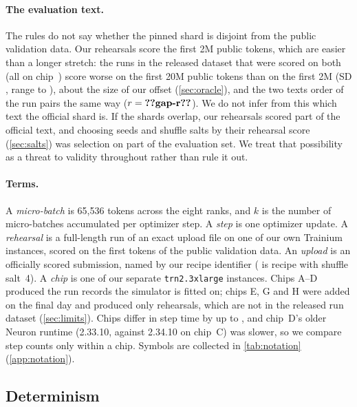 \paragraph{The evaluation text.} The rules do not say whether the pinned shard is disjoint from the public
validation data. Our rehearsals score the first 2M public tokens, which are easier than a longer stretch: the
 runs in the released dataset that were scored on both (all on chip~) score 
worse on the first 20M public tokens than on the first 2M (SD , range  to ),
about the size of our offset (\cref{sec:oracle}), and the two texts order  of the run pairs the
same way ($r=\val{gap-r}$). We do not infer from this which text the official shard is. If the shards overlap, our
rehearsals scored part of the official text, and choosing seeds and shuffle salts by their rehearsal score
(\cref{sec:salts}) was selection on part of the evaluation set. We treat that possibility as a threat to validity
throughout rather than rule it out.

\paragraph{Terms.} A \emph{micro-batch} is 65{,}536 tokens across the eight ranks, and $k$ is the number of
micro-batches accumulated per optimizer step. A \emph{step} is one optimizer update. A \emph{rehearsal} is a
full-length run of an exact upload file on one of our own Trainium instances, scored on the first  tokens of
the public validation data. An \emph{upload} is an officially scored submission, named by our recipe identifier
( is recipe  with shuffle salt~4). A \emph{chip} is one of our separate \texttt{trn2.3xlarge}
instances. Chips A--D produced the run records the simulator is fitted on; chips E, G and H were added on the final
day and produced only rehearsals, which are not in the released run dataset (\cref{sec:limits}). Chips differ in step
time by up to \docnum{}, and chip~D's older Neuron runtime (2.33.10, against 2.34.10 on chip~C) was
\docnum{} slower, so we compare step counts only within a chip. Symbols are collected in
\cref{tab:notation} (\cref{app:notation}).

\subsection{Determinism}
\label{sec:determinism}


